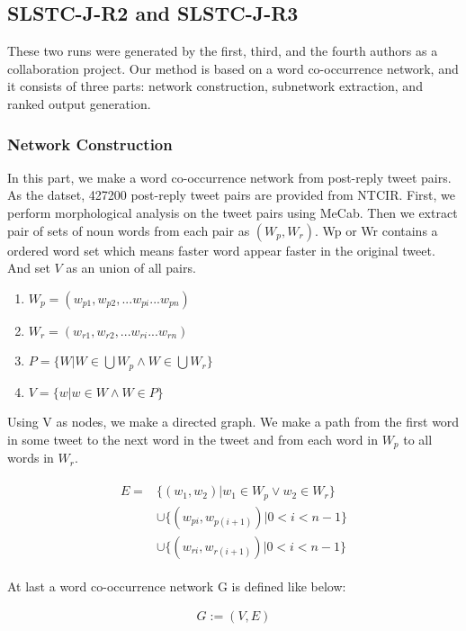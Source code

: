 \documentclass{../style/sig-alternate}
\begin{document}
\subsection{SLSTC-J-R2 and SLSTC-J-R3}
These two runs were generated by the first, third, and the fourth authors as a collaboration project.
Our method is based on a word co-occurrence network, and it consists of three parts:
network construction, subnetwork extraction, and ranked output generation.

\subsubsection{Network Construction}
In this part, we make a word co-occurrence network from post-reply tweet pairs.
As the datset, 427200 post-reply tweet pairs are provided from NTCIR.
First, we perform morphological analysis on the tweet pairs using MeCab\cite{mecab}. Then we extract pair of sets of noun words from each pair as \((W_{p}, W_{r})\). Wp or Wr contains a ordered word set which means faster word appear faster in the original tweet. And set \(V\) as an union of all pairs.

\begin{enumerate}
    \item \(W_{p} = (w_{p1}, w_{p2}, ... w_{pi} ... w_{pn}) \)
    \item \(W_{r} = (w_{r1}, w_{r2}, ... w_{ri} ... w_{rn}) \)
    \item \(P = \{W | W \in \bigcup W_{p} \wedge W \in \bigcup W_{r}\}\)
    \item \(V = \{w | w \in W \wedge W \in P\} \)
\end{enumerate}

Using V as nodes, we make a directed graph. We make a path from the first word in some tweet to the next word in the tweet and from each word in \( W_{p} \) to all words in \(W_{r} \).

\begin{eqnarray}
\begin{split}
E = &\{(w_{1}, w_{2}) | w_{1}\in W_{p} \lor w_{2}\in W_{r}\}\\
&\cup \{(w_{pi}, w_{p(i+1)}) | 0 < i < n-1\}\\
&\cup \{(w_{ri}, w_{r(i+1)}) | 0 < i < n-1\}
\end{split}
\end{eqnarray}


At last a word co-occurrence network G is defined like below:

\begin{eqnarray}
G := (V,E)
\end{eqnarray}
\end{document}
